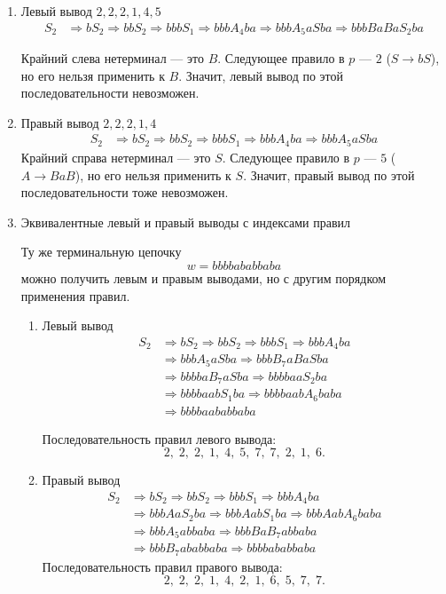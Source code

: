 \begin{enumerate}
    \item Левый вывод
    \(2,2,2,1,4,5\)
    \begin{align*}
    S_2 &\Rightarrow bS_2 \Rightarrow bbS_2 \Rightarrow bbbS_1 \Rightarrow bbbA_4ba \Rightarrow bbbA_5aSba \Rightarrow bbbBaBaS_2ba 
    \end{align*}

    Крайний слева нетерминал --- это \(B\). Следующее правило в \(p\) ---
    \(2\) (\(S\to bS\)), но его нельзя применить к \(B\). Значит, левый вывод
    по этой последовательности невозможен.
    
    \item Правый вывод \(2,2,2,1,4\)
    \begin{align*}
    S_2 &\Rightarrow bS_2 \Rightarrow bbS_2 \Rightarrow bbbS_1 \Rightarrow bbbA_4ba \Rightarrow bbbA_5aSba 
    \end{align*}
    Крайний справа нетерминал --- это \(S\). Следующее правило в \(p\) ---
    \(5\) (\(A\to BaB\)), но его нельзя применить к \(S\). Значит, правый вывод
    по этой последовательности тоже невозможен.

    \item Эквивалентные левый и правый выводы с индексами правил

    Ту же терминальную цепочку
    \[
    w=bbbbababbaba
    \]
    можно получить левым и правым выводами, но с другим порядком применения
    правил.
    \begin{enumerate}
 
    \item Левый вывод
    \[
    \begin{aligned}
    S_2 &\Rightarrow bS_2 \Rightarrow bbS_2 \Rightarrow bbbS_1 \Rightarrow bbbA_4ba \\
        &\Rightarrow bbbA_5aSba \Rightarrow bbbB_7aBaSba  \\
        &\Rightarrow bbbbaB_7aSba \Rightarrow bbbbaaS_2ba \\
        &\Rightarrow bbbbaabS_1ba \Rightarrow bbbbaabA_6baba \\
        &\Rightarrow bbbbaababbaba
    \end{aligned}
    \]
    
    Последовательность правил левого вывода:
    \[
    2,\;2,\;2,\;1,\;4,\;5,\;7,\;7,\;2,\;1,\;6.
    \]
    
    \item Правый вывод
    \[
    \begin{aligned}
    S_2 &\Rightarrow bS_2 \Rightarrow bbS_2 \Rightarrow bbbS_1 \Rightarrow bbbA_4ba \\
        &\Rightarrow bbbAaS_2ba \Rightarrow bbbAabS_1ba \Rightarrow bbbAabA_6baba \\
        &\Rightarrow bbbA_5abbaba \Rightarrow bbbBaB_7abbaba \\
        &\Rightarrow bbbB_7ababbaba \Rightarrow bbbbababbaba
    \end{aligned}
    \]
    Последовательность правил правого вывода:
    \[
    2,\;2,\;2,\;1,\;4,\;2,\;1,\;6,\;5,\;7,\;7.
    \]
    \end{enumerate}
    
    \end{enumerate}

